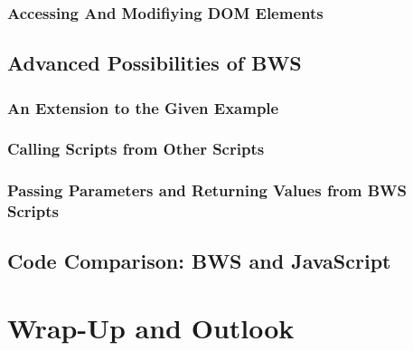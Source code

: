  

  \subsection{Accessing And Modifiying DOM Elements}


 \section{Advanced Possibilities of BWS}
  \subsection{An Extension to the Given Example}
  \subsection{Calling Scripts from Other Scripts}
  \subsection{Passing Parameters and Returning Values from BWS Scripts}
 \section{Code Comparison: BWS and JavaScript}
\chapter{Wrap-Up and Outlook}